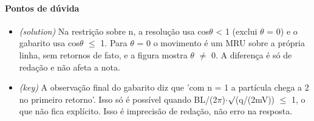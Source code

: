 \documentclass{article}%
\begin{document}
\paragraph{Pontos de dúvida}%
\begin{itemize}%
\item%
\textit{(solution)} Na restrição sobre n, a resolução usa cos$\theta$ < 1 (exclui $\theta$ = 0) e o gabarito usa cos$\theta$ $\leq$ 1. Para $\theta$ = 0 o movimento é um MRU sobre a própria linha, sem retornos de fato, e a figura mostra $\theta$ $\neq$ 0. A diferença é só de redação e não afeta a nota.%
\item%
\textit{(key)} A observação final do gabarito diz que 'com n = 1 a partícula chega a 2 no primeiro retorno'. Isso só é possível quando BL/(2$\pi$)$\cdot$$\surd$(q/(2mV)) $\leq$ 1, o que não fica explícito. Isso é imprecisão de redação, não erro na resposta.%
\end{itemize}%
\end{document}
